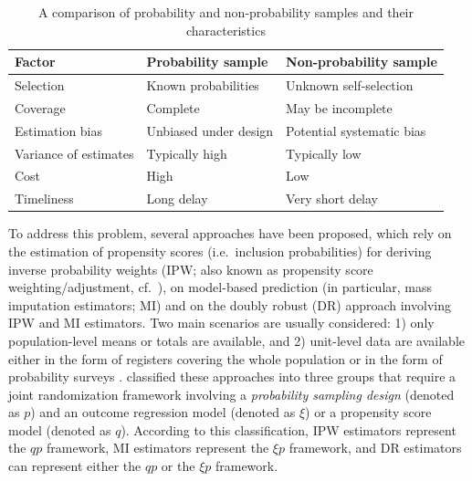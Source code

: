 \documentclass[
]{jss}
\begin{document}
\begin{table}[ht!]
    \centering
    \begin{tabular}{lll}
    \hline
    \textbf{Factor}   &  \textbf{Probability sample} & \textbf{Non-probability sample}\\
    \hline
    Selection & Known probabilities & Unknown self-selection \\
    Coverage & Complete & May be incomplete \\
    Estimation bias & Unbiased under design & Potential systematic bias \\
    Variance of estimates & Typically high & Typically low \\
    Cost & High & Low \\
    Timeliness & Long delay& Very short delay \\
    \hline
    \end{tabular}
    \caption{A comparison of probability and non-probability samples and their characteristics}
    \label{tab-comparison-characteristics}
\end{table}

To address this problem, several approaches have been proposed, which
rely on the estimation of propensity scores (i.e.~inclusion
probabilities) for deriving inverse probability weights (IPW; also known
as propensity score weighting/adjustment,
cf.~\citet{lee2006propensity, lee2009estimation}), on model-based
prediction (in particular, mass imputation estimators; MI) and on the
doubly robust (DR) approach involving IPW and MI estimators. Two main
scenarios are usually considered: 1) only population-level means or
totals are available, and 2) unit-level data are available either in the
form of registers covering the whole population or in the form of
probability surveys \citep[cf.][]{elliott_inference_2017}.
\citet{wu2022statistical} classified these approaches into three groups
that require a joint randomization framework involving a
\textit{probability sampling design} (denoted as \(p\)) and an outcome
regression model (denoted as \(\xi\)) or a propensity score model
(denoted as \(q\)). According to this classification, IPW estimators
represent the \(qp\) framework, MI estimators represent the \(\xi p\)
framework, and DR estimators can represent either the \(qp\) or the
\(\xi p\) framework.
\end{document}
